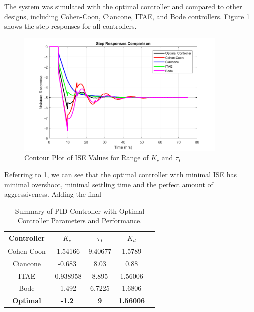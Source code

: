 \documentclass[12pt]{article}
\begin{document}
\begin{enumerate}
\begin{enumerate}
    The system was simulated with the optimal controller and compared to other designs, including Cohen-Coon, Ciancone, ITAE, and Bode controllers. Figure \ref{fig:figure2_4b} shows the step responses for all controllers.

    \begin{figure}[H]
      \centering
      \includegraphics[width=0.9\textwidth]{Figures/figure2-4b.png}
      \caption{Contour Plot of ISE Values for Range of \( K_c \) and \( \tau_I \)}
      \label{fig:figure2_4b}
    \end{figure}

    Referring to \ref{fig:figure2_4b}, we can see that the optimal controller with minimal ISE has minimal overshoot, minimal settling time and the perfect amount of aggressiveness. Adding the final
    
    \begin{table}[H]
      \centering
      \begin{tabular}{|c|c|c|c|c|}
          \hline
          \textbf{Controller} & \textbf{\( K_c \)} & \textbf{\( \tau_I \) } & \textbf{\( K_d \) } \\
          \hline
          Cohen-Coon & -1.54166 & 9.40677 & 1.5789 \\
          \hline
          Ciancone & -0.683 & 8.03 & 0.88 \\
          \hline
          ITAE & -0.938958 & 8.895 & 1.56006 \\
          \hline
          Bode & -1.492 & 6.7225 & 1.6806 \\
          \hline
          \textbf{Optimal} & \textbf{-1.2} & \textbf{9} & \textbf{1.56006} \\
          \hline
      \end{tabular}
      \caption{Summary of PID Controller with Optimal Controller Parameters and Performance.}
      \label{tab:figure2-4b}
    \end{table}


\end{enumerate}
\end{enumerate}
\end{document}
